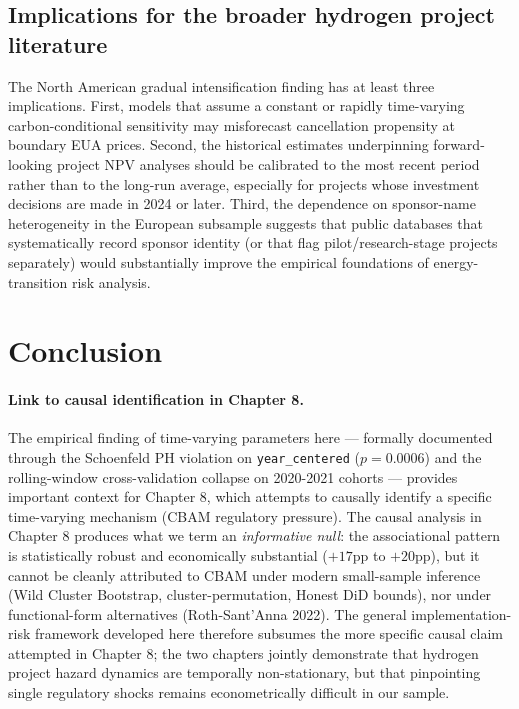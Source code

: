 \subsection{Implications for the broader hydrogen project literature}

The North American gradual intensification finding has at least three implications. First, models that assume a constant or rapidly time-varying carbon-conditional sensitivity may misforecast cancellation propensity at boundary EUA prices. Second, the historical estimates underpinning forward-looking project NPV analyses should be calibrated to the most recent period rather than to the long-run average, especially for projects whose investment decisions are made in 2024 or later. Third, the dependence on sponsor-name heterogeneity in the European subsample suggests that public databases that systematically record sponsor identity (or that flag pilot/research-stage projects separately) would substantially improve the empirical foundations of energy-transition risk analysis.

\section{Conclusion}
\paragraph{Link to causal identification in Chapter 8.} The empirical finding of time-varying parameters here — formally documented through the Schoenfeld PH violation on \texttt{year\_centered} ($p = 0.0006$) and the rolling-window cross-validation collapse on 2020-2021 cohorts — provides important context for Chapter 8, which attempts to causally identify a specific time-varying mechanism (CBAM regulatory pressure). The causal analysis in Chapter 8 produces what we term an \textit{informative null}: the associational pattern is statistically robust and economically substantial ($+17$pp to $+20$pp), but it cannot be cleanly attributed to CBAM under modern small-sample inference (Wild Cluster Bootstrap, cluster-permutation, Honest DiD bounds), nor under functional-form alternatives (Roth-Sant'Anna 2022). The general implementation-risk framework developed here therefore subsumes the more specific causal claim attempted in Chapter 8; the two chapters jointly demonstrate that hydrogen project hazard dynamics are temporally non-stationary, but that pinpointing single regulatory shocks remains econometrically difficult in our sample.


